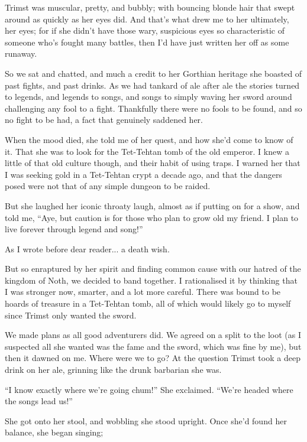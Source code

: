\documentclass[12pt, a4paper]{book}
\begin{document}
Trimst was muscular, pretty, and bubbly; with bouncing blonde hair that swept around as quickly as her eyes did. And that's what drew me to her ultimately, her eyes; for if she didn't have those wary, suspicious eyes so characteristic of someone who's fought many battles, then I'd have just written her off as some runaway.

So we sat and chatted, and much a credit to her Gorthian heritage she boasted of past fights, and past drinks. As we had tankard of ale after ale the stories turned to legends, and legends to songs, and songs to simply waving her sword around challenging any fool to a fight. Thankfully there were no fools to be found, and so no fight to be had, a fact that genuinely saddened her.

When the mood died, she told me of her quest, and how she'd come to know of it. That she was to look for the Tet-Tehtan tomb of the old emperor. I knew a little of that old culture though, and their habit of using traps. I warned her that I was seeking gold in a Tet-Tehtan crypt a decade ago, and that the dangers posed were not that of any simple dungeon to be raided.

But she laughed her iconic throaty laugh, almost as if putting on for a show, and told me, ``Aye, but caution is for those who plan to grow old my friend. I plan to live forever through legend and song!''

As I wrote before dear reader... a death wish. 

But so enraptured by her spirit and finding common cause with our hatred of the kingdom of Noth, we decided to band together. I rationalised it by thinking that I was stronger now, smarter, and a lot more careful. There was bound to be hoards of treasure in a Tet-Tehtan tomb, all of which would likely go to myself since Trimst only wanted the sword. 

We made plans as all good adventurers did. We agreed on a split to the loot (as I suspected all she wanted was the fame and the sword, which was fine by me), but then it dawned on me. Where were we to go? At the question Trimst took a deep drink on her ale, grinning like the drunk barbarian she was.

``I know exactly where we're going chum!'' She exclaimed. ``We're headed where the songs lead us!''

She got onto her stool, and wobbling she stood upright. Once she'd found her balance, she began singing;

\end{document}

